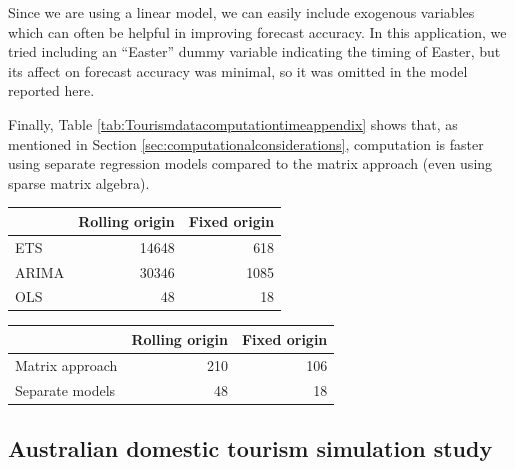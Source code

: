 \documentclass[11pt,a4paper,]{article}
\let\origtable\table
\let\endorigtable\endtable
\renewenvironment{table}[1][2] {
    \expandafter\origtable\expandafter[!htbp]
} {
    \endorigtable
}
\begin{document}
Since we are using a linear model, we can easily include exogenous variables which can often be helpful in improving forecast accuracy. In this application, we tried including an ``Easter'' dummy variable indicating the timing of Easter, but its affect on forecast accuracy was minimal, so it was omitted in the model reported here.

Finally, Table \ref{tab:Tourismdatacomputationtimeappendix} shows that, as mentioned in Section \ref{sec:computationalconsiderations}, computation is faster using separate regression models compared to the matrix approach (even using sparse matrix algebra).

\begin{table}

\caption{\label{tab:Tourismdatacomputationtime}Computation time (seconds) for ETS, ARIMA and OLS with reconciliation, for  Rolling and fixed origin forecasts, on a 24 months test set.}
\centering
\begin{tabular}[t]{lrr}
\toprule
 & Rolling origin & Fixed origin\\
\midrule
ETS & 14648 & 618\\
ARIMA & 30346 & 1085\\
OLS & 48 & 18\\
\bottomrule
\end{tabular}
\end{table}

\begin{table}

\caption{\label{tab:Tourismdatacomputationtimeappendix}Computation time (seconds) for OLS using the matrix approach and separate regression models, with reconciliation, for rolling and fixed origin, on a 12 months test set.}
\centering
\begin{tabular}[t]{lrr}
\toprule
 & Rolling origin & Fixed origin\\
\midrule
Matrix approach & 210 & 106\\
Separate models & 48 & 18\\
\bottomrule
\end{tabular}
\end{table}

\hypertarget{australian-domestic-tourism-simulation-study}{%
\subsection{Australian domestic tourism simulation study}\label{australian-domestic-tourism-simulation-study}}
\end{document}
